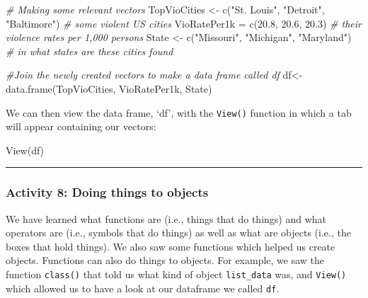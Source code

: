 \documentclass[
]{book}
\newenvironment{Shaded}{\begin{snugshade}}{\end{snugshade}}
\newcommand{\CommentTok}[1]{\textcolor[rgb]{0.56,0.35,0.01}{\textit{#1}}}
\newcommand{\FloatTok}[1]{\textcolor[rgb]{0.00,0.00,0.81}{#1}}
\newcommand{\FunctionTok}[1]{\textcolor[rgb]{0.00,0.00,0.00}{#1}}
\newcommand{\NormalTok}[1]{#1}
\newcommand{\OtherTok}[1]{\textcolor[rgb]{0.56,0.35,0.01}{#1}}
\newcommand{\StringTok}[1]{\textcolor[rgb]{0.31,0.60,0.02}{#1}}
\begin{document}
\begin{Shaded}
\begin{Highlighting}[]
\CommentTok{\# Making some relevant vectors}
\NormalTok{TopVioCities }\OtherTok{\textless{}{-}} \FunctionTok{c}\NormalTok{(}\StringTok{"St. Louis"}\NormalTok{, }\StringTok{"Detroit"}\NormalTok{, }\StringTok{"Baltimore"}\NormalTok{) }\CommentTok{\# some violent US cities}
\NormalTok{VioRatePer1k }\OtherTok{=} \FunctionTok{c}\NormalTok{(}\FloatTok{20.8}\NormalTok{, }\FloatTok{20.6}\NormalTok{, }\FloatTok{20.3}\NormalTok{) }\CommentTok{\# their violence rates per 1,000 persons}
\NormalTok{State }\OtherTok{\textless{}{-}} \FunctionTok{c}\NormalTok{(}\StringTok{"Missouri"}\NormalTok{, }\StringTok{"Michigan"}\NormalTok{, }\StringTok{"Maryland"}\NormalTok{) }\CommentTok{\# in what states are these cities found}

\CommentTok{\#Join the newly created vectors to make a data frame called \textquotesingle{}df\textquotesingle{}}
\NormalTok{df}\OtherTok{\textless{}{-}}\FunctionTok{data.frame}\NormalTok{(TopVioCities, VioRatePer1k, State)}
\end{Highlighting}
\end{Shaded}

We can then view the data frame, `df', with the \texttt{View()} function in which a tab will appear containing our vectors:

\begin{Shaded}
\begin{Highlighting}[]
\FunctionTok{View}\NormalTok{(df)}
\end{Highlighting}
\end{Shaded}

\begin{center}\rule{0.5\linewidth}{0.5pt}\end{center}

\hypertarget{activity-8-doing-things-to-objects}{%
\subsubsection{Activity 8: Doing things to objects}\label{activity-8-doing-things-to-objects}}

We have learned what functions are (i.e., things that do things) and what operators are (i.e., symbols that do things) as well as what are objects (i.e., the boxes that hold things). We also saw some functions which helped us create objects. Functions can also do things to objects. For example, we saw the function \texttt{class()} that told us what kind of object \texttt{list\_data} was, and \texttt{View()} which allowed us to have a look at our dataframe we called \texttt{df}.
\end{document}

